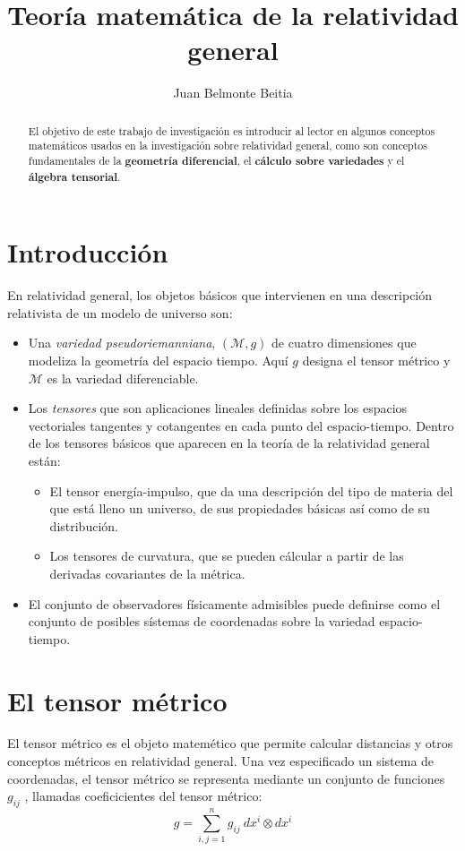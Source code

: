 \documentclass[a4paper,10pt]{article}
\begin{document}
\title{Teoría matemática de la relatividad general}
\author{Juan Belmonte Beitia}
\date{}

\maketitle

\begin{abstract}
El objetivo de este trabajo de investigación es introducir al lector en algunos
conceptos matemáticos usados en la investigación sobre relatividad
general, como son conceptos fundamentales de la \textbf{geometría diferencial},
el \textbf{cálculo sobre variedades} y el \textbf{álgebra tensorial}.
\end{abstract}

\section{Introducción}
En relatividad general, los objetos básicos que intervienen en una descripción
relativista de un modelo de universo son:

\begin{itemize}
\item Una \textit{variedad pseudoriemanniana}, $(\mathcal{M}, g)$ de cuatro dimensiones 
que modeliza la geometría del espacio tiempo. Aquí $g$ designa el tensor métrico y
$\mathcal{M}$ es la variedad diferenciable.

\item Los \textit{tensores} que son aplicaciones lineales definidas sobre los espacios
vectoriales tangentes y cotangentes en cada punto del espacio-tiempo. Dentro
de los tensores básicos que aparecen en la teoría de la relatividad general
están:
\begin{itemize}
\item El tensor energía-impulso, que da una descripción del tipo de materia
del que está lleno un universo, de sus propiedades básicas así como
de su distribución.
\item Los tensores de curvatura, que se pueden cálcular a partir de las
derivadas covariantes de la métrica.
\end{itemize}

\item El conjunto de observadores físicamente admisibles puede definirse como
el conjunto de posibles sístemas de coordenadas sobre la variedad espacio-tiempo.
\end{itemize}

\section{El tensor métrico}
El tensor métrico es el objeto matemético que permite calcular distancias
y otros conceptos métricos en relatividad general. Una vez especificado un 
sistema de coordenadas, el tensor métrico se representa mediante un conjunto
de funciones $g_{ij}$ , llamadas coeficicientes del tensor métrico:
\begin{equation}
\label{eq:metric}
g = \sum_{i,j=1}^n g_{ij}\ dx^i\otimes dx^i
\end{equation}
\end{document}
